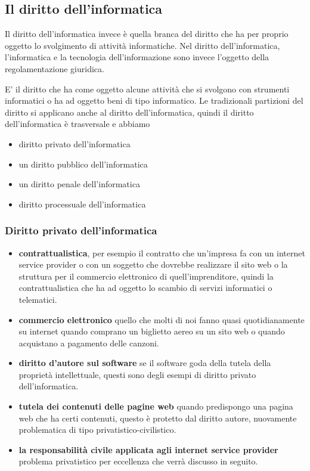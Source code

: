 \subsection{Il diritto dell'informatica} 
Il diritto dell'informatica invece è quella branca del diritto che ha per proprio oggetto lo svolgimento di attività informatiche. 
Nel diritto dell'informatica, l'informatica e la tecnologia dell'informazione sono invece l'oggetto della regolamentazione giuridica.

E' il diritto che ha come oggetto alcune attività che si svolgono con strumenti informatici o ha ad oggetto beni di tipo informatico. Le tradizionali partizioni del diritto si applicano anche al diritto dell'informatica, quindi il diritto dell'informatica è trasversale e abbiamo 
\begin{itemize}
    \item diritto privato dell'informatica
    \item un diritto pubblico dell'informatica 
    \item un diritto penale dell'informatica 
    \item diritto processuale dell'informatica 
\end{itemize}

\subsubsection{Diritto privato dell'informatica}

\begin{itemize}
    \item \textbf{contrattualistica}, per esempio il contratto che un'impresa fa con un internet service provider o con un soggetto che dovrebbe realizzare il sito web o la struttura per il commercio elettronico di quell'imprenditore, quindi la contrattualistica che ha ad oggetto lo scambio di servizi informatici o telematici.
    \item \textbf{commercio elettronico} quello che molti di noi fanno quasi quotidianamente su internet quando comprano un biglietto aereo su un sito web o quando acquistano a pagamento delle canzoni. 
    \item \textbf{diritto d'autore sul software} se il software goda della tutela della proprietà intellettuale, questi sono degli esempi di diritto privato dell'informatica.  
    \item \textbf{tutela dei contenuti delle pagine web} quando predispongo una pagina web che ha certi contenuti, questo è protetto dal diritto autore, nuovamente problematica di tipo privatistico-civilistico. 
    \item \textbf{la responsabilità civile applicata agli internet service provider} problema privatistico per eccellenza che verrà discusso in seguito.
\end{itemize}

